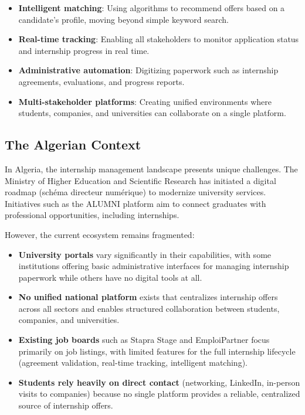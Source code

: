 \begin{itemize}
    \item \textbf{Intelligent matching}: Using algorithms to recommend offers based on a candidate's profile, moving beyond simple keyword search.
    \item \textbf{Real-time tracking}: Enabling all stakeholders to monitor application status and internship progress in real time.
    \item \textbf{Administrative automation}: Digitizing paperwork such as internship agreements, evaluations, and progress reports.
    \item \textbf{Multi-stakeholder platforms}: Creating unified environments where students, companies, and universities can collaborate on a single platform.
\end{itemize}

\subsection{The Algerian Context}

In Algeria, the internship management landscape presents unique challenges. The Ministry of Higher Education and Scientific Research has initiated a digital roadmap (sch\'ema directeur num\'erique) to modernize university services. Initiatives such as the ALUMNI platform aim to connect graduates with professional opportunities, including internships.

However, the current ecosystem remains fragmented:

\begin{itemize}
    \item \textbf{University portals} vary significantly in their capabilities, with some institutions offering basic administrative interfaces for managing internship paperwork while others have no digital tools at all.
    \item \textbf{No unified national platform} exists that centralizes internship offers across all sectors and enables structured collaboration between students, companies, and universities.
    \item \textbf{Existing job boards} such as Stapra Stage and EmploiPartner focus primarily on job listings, with limited features for the full internship lifecycle (agreement validation, real-time tracking, intelligent matching).
    \item \textbf{Students rely heavily on direct contact} (networking, LinkedIn, in-person visits to companies) because no single platform provides a reliable, centralized source of internship offers.
\end{itemize}

